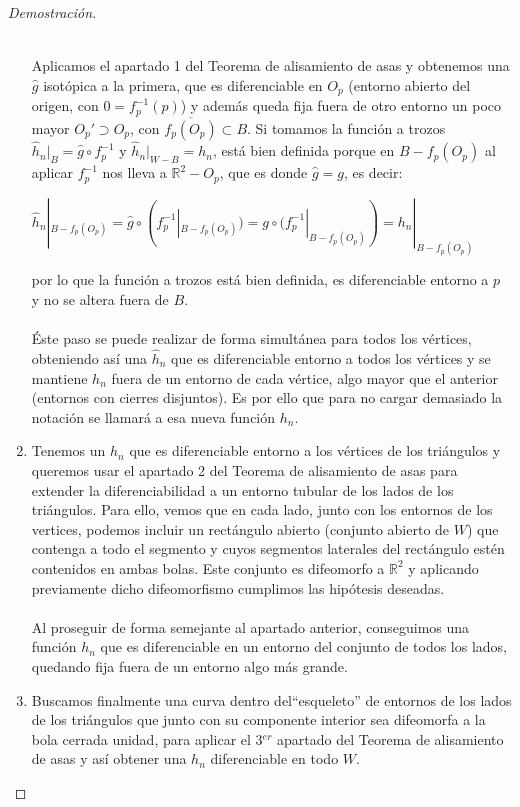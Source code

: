 \begin{proof}[Demostración]
\begin{enumerate}
			\\ Aplicamos el apartado 1 del Teorema de alisamiento de asas y obtenemos una $\widehat{g}$ isotópica a la primera, que es diferenciable en $O_p$ (entorno abierto del origen, con $0=f_p^{-1}(p)$) y además queda fija fuera de otro entorno un poco mayor $O_p'\supset O_p$, con $\overline{f_p(O_p)}\subset B $. Si tomamos la función a trozos $\widehat{h}_n|_{B}=\widehat{g}\circ f_p^{-1}$ y $\widehat{h}_n|_{W-B}=h_n$, está bien definida porque en $B-f_p(O_p)$ al aplicar $f_p^{-1}$ nos lleva a $\mathbb{R}^2-O_p$, que es donde $\widehat{g}=g$, es decir: \\
			\begin{center}
				$\widehat{h}_n|_{B-f_p(O_p)}=\widehat{g}\circ(f_p^{-1}|_{B-f_p(O_p)})=g\circ(f_p^{-1}|_{B-f_p(O_p)})=h_n|_{B-f_p(O_p)}$\\
			\end{center}
			por lo que la función a trozos está bien definida, es diferenciable entorno a $p$ y no se altera fuera de $B$. \\
			\\ Éste paso se puede realizar de forma simultánea para todos los vértices, obteniendo así una $\widehat{h}_n$ que es diferenciable entorno a todos los vértices y se mantiene $h_n$ fuera de un entorno de cada vértice, algo mayor que el anterior (entornos con cierres disjuntos). Es por ello que para no cargar demasiado la notación se llamará a esa nueva función $h_n$.
			\item Tenemos un $h_n$ que es diferenciable entorno a los vértices de los triángulos y queremos usar el apartado 2 del Teorema de alisamiento de asas para extender la diferenciabilidad a un entorno tubular de los lados de los triángulos. Para ello, vemos que en cada lado, junto con los entornos de los vertices, podemos incluir un rectángulo abierto (conjunto abierto de $W$) que contenga a todo el segmento y cuyos segmentos laterales del rectángulo estén contenidos en ambas bolas. Este conjunto es difeomorfo a $\mathbb{R}^2$ y aplicando previamente dicho difeomorfismo cumplimos las hipótesis deseadas.\\
			\\ Al proseguir de forma semejante al apartado anterior, conseguimos una función $h_n$ que es diferenciable en un entorno del conjunto de todos los lados, quedando fija fuera de un entorno algo más grande.
			\item Buscamos finalmente una curva dentro del``esqueleto'' de entornos de los lados de los triángulos que junto con su componente interior sea difeomorfa a la bola cerrada unidad, para aplicar el 3$^{er}$ apartado del Teorema de alisamiento de asas y así obtener una $h_n$ diferenciable en todo $W$.\\

\end{enumerate}
\end{proof}
